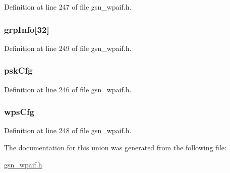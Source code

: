 Definition at line 247 of file gsn\_\-wpaif.h.

\hypertarget{a00426_a150318da5e0341a089e4fc824a775394}{
\subsubsection[{grpInfo}]{ {\bf grpInfo}\mbox{[}32\mbox{]}}}
\label{a00426_a150318da5e0341a089e4fc824a775394}


Definition at line 249 of file gsn\_\-wpaif.h.

\hypertarget{a00426_a2619be40198046ea242a25a18cada2cf}{
\subsubsection[{pskCfg}]{ {\bf pskCfg}}}
\label{a00426_a2619be40198046ea242a25a18cada2cf}


Definition at line 246 of file gsn\_\-wpaif.h.

\hypertarget{a00426_ad38f00ce920632f4613cb9ab4b7abd9a}{
\subsubsection[{wpsCfg}]{ {\bf wpsCfg}}}
\label{a00426_ad38f00ce920632f4613cb9ab4b7abd9a}


Definition at line 248 of file gsn\_\-wpaif.h.



The documentation for this union was generated from the following file:\begin{DoxyCompactItemize}
\item 
\hyperlink{a00615}{gsn\_\-wpaif.h}\end{DoxyCompactItemize}
